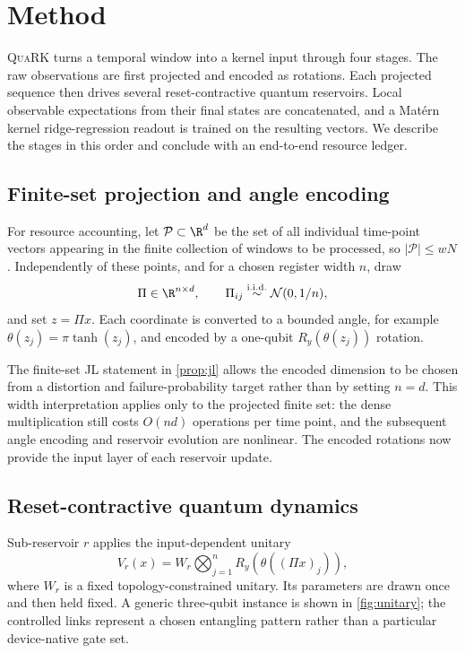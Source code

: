 \section{Method}
\label{sec:method}

\textsc{QuaRK} turns a temporal window into a kernel input through four stages.
The raw observations are first projected and encoded as rotations. Each
projected sequence then drives several reset-contractive quantum reservoirs.
Local observable expectations from their final states are concatenated, and a
Mat\'ern kernel ridge-regression readout is trained on the resulting vectors.
We describe the stages in this order and conclude with an end-to-end resource
ledger.

\subsection{Finite-set projection and angle encoding}

For resource accounting, let \(\mathcal P\subset\R^d\) be the set of all
individual time-point vectors appearing in the finite collection of windows to
be processed, so \(|\mathcal P|\leq wN\). Independently of these points, and for
a chosen register width \(n\), draw
\[
    \Pi\in\R^{n\times d},
    \qquad
    \Pi_{ij}\stackrel{\mathrm{i.i.d.}}{\sim}\mathcal N(0,1/n),
\]
and set \(z=\Pi x\). Each coordinate is converted to a bounded angle, for
example \(\theta(z_j)=\pi\tanh(z_j)\), and encoded by a one-qubit
\(R_y(\theta(z_j))\) rotation.

The finite-set JL statement in \cref{prop:jl} allows the encoded dimension to
be chosen from a distortion and failure-probability target rather than by
setting \(n=d\). This width interpretation applies only to the projected finite
set: the dense multiplication still costs \(O(nd)\) operations per time point,
and the subsequent angle encoding and reservoir evolution are nonlinear. The
encoded rotations now provide the input layer of each reservoir update.

\subsection{Reset-contractive quantum dynamics}

Sub-reservoir \(r\) applies the input-dependent unitary
\begin{equation}
    V_r(x)
    =
    W_r
    \bigotimes_{j=1}^n R_y\!\left(\theta((\Pi x)_j)\right),
    \label{eq:input-unitary}
\end{equation}
where \(W_r\) is a fixed topology-constrained unitary. Its parameters are drawn
once and then held fixed. A generic three-qubit instance is shown in
\cref{fig:unitary}; the controlled links represent a chosen entangling pattern
rather than a particular device-native gate set.

